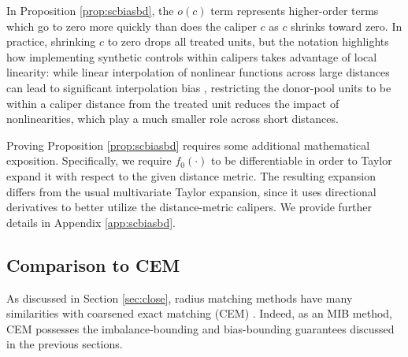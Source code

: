 \documentclass{article}
\begin{document}
In Proposition \ref{prop:scbiasbd}, the $o(c)$ term represents higher-order terms which go to zero more quickly than does the caliper $c$ as $c$ shrinks toward zero.
In practice, shrinking $c$ to zero drops all treated units, but the notation highlights how implementing synthetic controls within calipers takes advantage of local linearity:
while linear interpolation of nonlinear functions across large distances can lead to significant interpolation bias \citep{kellogg2021combining},
restricting the donor-pool units to be within a caliper distance from the treated unit reduces the impact of nonlinearities, which play a much smaller role across short distances.

Proving Proposition \ref{prop:scbiasbd} requires some additional mathematical exposition.
Specifically, we require $f_0(\cdot)$ to be differentiable in order to Taylor expand it with respect to the given distance metric.
The resulting expansion differs from the usual multivariate Taylor expansion, since it uses directional derivatives to better utilize the distance-metric calipers.
We provide further details in Appendix \ref{app:scbiasbd}.


\subsection{Comparison to CEM}
\label{sec:compCEM}

As discussed in Section \ref{sec:close}, radius matching methods have many similarities with coarsened exact matching (CEM) \citep{iacus2012causal}.
Indeed, as an MIB method, CEM possesses the imbalance-bounding and bias-bounding guarantees discussed in the previous sections.
\end{document}
